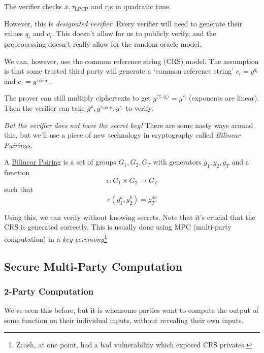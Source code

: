 The verifier checks $x, \tau_\mathrm{LPCP}$ and $r_i$s in quadratic time.

However, this is \emph{designated verifier}. Every verifier will need to generate their values $q_i$ and $c_i$. This doesn't allow for us to publicly verify, and the preprocessing doesn't really allow for the random oracle model.


We can, however, use the common reference string (CRS) model. The assumption is that some trusted third party will generate a `common reference string' $c_i =g^{q_t}$ and $c_\tau = g^{\tau_\mathrm{LPCP}}$.

The prover can still multiply ciphertexts to get $g^{\langle\pi, q_i\rangle} = g^{r_i}$ (exponents are linear). Then the verifier can take $g^x, g^{\tau_\mathrm{LPCP}}, g^{r_i}$ to verify.

\emph{But the verifier does not have the secret key!} There are some nasty ways around this, but we'll use a piece of new technology in cryptography called \emph{Bilinear Pairings}.

\begin{definition}
    A \ul{Bilinear Pairing} is a set of groups $G_1, G_2, G_T$ with generators $g_1, g_2, g_T$ and a function
    \[e: G_1\times G_2\to G_T\]
    such that
    \[e(g_1^a, g_2^b) = g_T^{ab}\]
\end{definition}

Using this, we can verify without knowing secrets. Note that it's crucial that the CRS is generated correctly. This is usually done using MPC (multi-party computation) in a \emph{key ceremony}\footnote{Zcash, at one point, had a bad vulnerability which exposed CRS privates. }

\subsection{Secure Multi-Party Computation}

\subsubsection{2-Party Computation}

We've seen this before, but it is whensome parties want to compute the output of some function on their individual inputs, without revealing their own inputs.

